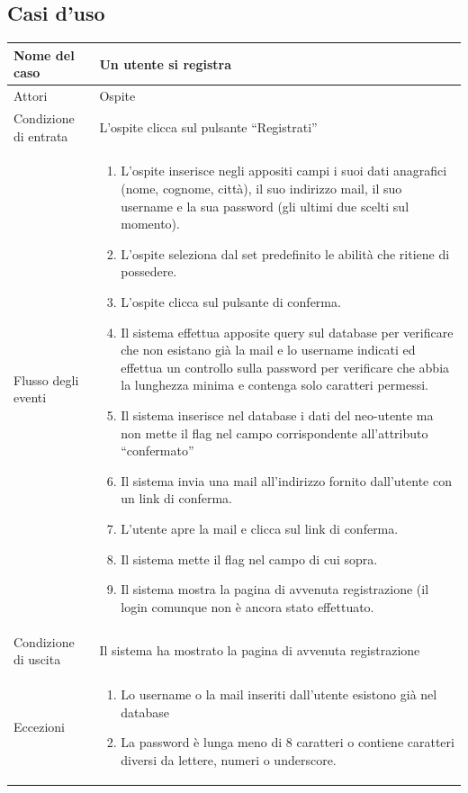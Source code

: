 \documentclass[a4paper,12pt]{article}
\begin{document}
\subsection{Casi d'uso}
\begin{tabularx}{\textwidth}{|l|X|}
\hline Nome del caso & Un utente si registra \\ 
\hline Attori & Ospite \\ 
\hline Condizione di entrata & L'ospite clicca sul pulsante “Registrati” \\ 
\hline Flusso degli eventi & 
\begin{enumerate}
\itemsep0em 
\item L'ospite inserisce negli appositi campi i suoi dati anagrafici (nome, cognome, città), il suo indirizzo mail, il suo username e la sua password (gli ultimi due scelti sul momento).
\item L'ospite seleziona dal set predefinito le abilità che ritiene di possedere.
\item L'ospite clicca sul pulsante di conferma.
\item Il sistema effettua apposite query sul database per verificare che non esistano già la mail e lo username indicati ed effettua un controllo sulla password per verificare che abbia la lunghezza minima e contenga solo caratteri permessi.
\item Il sistema inserisce nel database i dati del neo-utente ma non mette il flag nel campo corrispondente all'attributo “confermato”
\item Il sistema invia una mail all'indirizzo fornito dall'utente con un link di conferma.
\item L'utente apre la mail e clicca sul link di conferma.
\item Il sistema mette il flag nel campo di cui sopra.
\item Il sistema mostra la pagina di avvenuta registrazione (il login comunque non è ancora stato effettuato.
\end{enumerate}
 \\ 
\hline Condizione di uscita & Il sistema ha mostrato la pagina di avvenuta registrazione \\
\hline Eccezioni & 
\begin{enumerate}
\itemsep0em 
\item Lo username o la mail inseriti dall'utente esistono già nel database
\item La password è lunga meno di 8 caratteri o contiene caratteri diversi da lettere, numeri o underscore.
\end{enumerate}
\\
\hline 
\end{tabularx}
\end{document}

